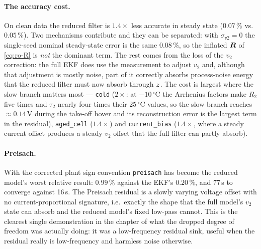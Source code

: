 \paragraph{The accuracy cost.}  On clean data the reduced filter is $1.4\times$ less accurate in
steady state ($0.07\,\%$ vs.\ $0.05\,\%$).  Two mechanisms contribute and they can be separated:
with $\sigma_{v2}=0$ the single-seed nominal steady-state error is the same $0.08\,\%$, so the
inflated $\bm{R}$ of \eqref{eq:ro-R} is \emph{not} the dominant term.  The rest comes from the loss of
the $v_2$ correction: the full EKF does use the measurement to adjust $v_2$ and, although that
adjustment is mostly noise, part of it correctly absorbs process-noise energy that the reduced
filter must now absorb through $z$.  The cost is largest where the slow branch matters most ---
\texttt{cold} ($2\times$: at $-10$\,\ensuremath{{}^\circ}C the Arrhenius factors make $R_2$ five
times and $\tau_2$ nearly four times their $25$\,\ensuremath{{}^\circ}C values, so the slow branch
reaches $\approx0.14$\,V during the take-off hover and its reconstruction error is the largest term
in the residual), \texttt{aged\_cell} ($1.4\times$) and \texttt{current\_bias} ($1.4\times$, where
a steady current offset produces a steady $v_2$ offset that the full filter can partly absorb).

\paragraph{Preisach.}  With the corrected plant sign convention \texttt{preisach} has become the
reduced model's worst relative result: $0.99\,\%$ against the EKF's $0.20\,\%$, and 77\,s to
converge against 16\,s.  The Preisach residual is a slowly varying voltage offset with no
current-proportional signature, i.e.\ exactly the shape that the full model's $v_2$ state can
absorb and the reduced model's fixed low-pass cannot.  This is the clearest single demonstration in
the chapter of what the dropped degree of freedom was actually doing: it was a low-frequency
residual sink, useful when the residual really is low-frequency and harmless noise otherwise.

